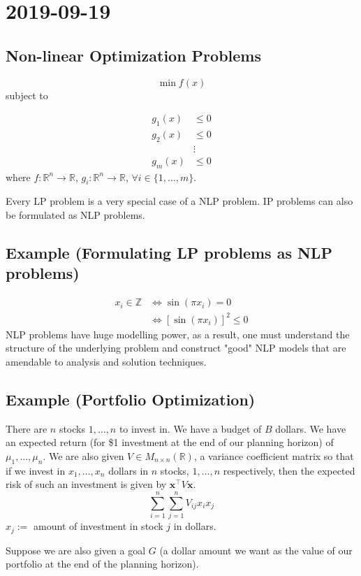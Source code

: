\section{2019-09-19}
\subsection{Non-linear Optimization Problems}
\[\min f(x)\]
subject to

\begin{align*}
    g_1(x)&\le 0\\
    g_2(x)&\le 0\\
    &\vdots\\
    g_m(x)&\le 0
\end{align*}
where
$f:\mathbb{R}^n\rightarrow \mathbb{R}$, 
$g_i:\mathbb{R}^n\rightarrow\mathbb{R}$, $\forall i\in\{1,\dots,m\}$.

Every LP problem is a very special case of a NLP problem. IP problems can
also be formulated as NLP problems.
\subsection{Example (Formulating LP problems as NLP problems)}
\begin{align*}
    x_i\in\mathbb{Z}&\iff \sin(\pi x_i)=0\\
    &\iff [\sin(\pi x_i)]^2\le 0
\end{align*}
NLP problems have huge modelling power, as a result, one must understand the
structure of the underlying problem and construct "good" NLP models that are
amendable to analysis and solution techniques.

\subsection{Example (Portfolio Optimization)}
There are $n$ stocks $1,\dots,n$ to invest in. We have a budget of $B$ dollars.
We have an expected return (for \$1 investment at the end of our planning
horizon) of $\mu_1,\dots,\mu_n$. We are also given 
$V\in M_{n\times n}(\mathbb{R})$, a variance coefficient matrix so that if
we invest in $x_1,\dots,x_n$ dollars in $n$ stocks, $1,\dots,n$ respectively,
then the expected risk of such an investment is given by 
$\mathbf{x}^\top  V\mathbf{x}$.
\[\sum\limits_{i = 1}^{n}\sum\limits_{j = 1}^{n}V_{ij}x_ix_j\]
$x_j:=$ amount of investment in stock $j$ in dollars.

Suppose we are also given a goal $G$ (a dollar amount we want as the value
of our portfolio at the end of the planning horizon).

